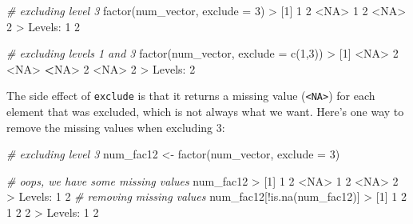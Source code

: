\documentclass[
]{book}
\newenvironment{Shaded}{\begin{snugshade}}{\end{snugshade}}
\newcommand{\AttributeTok}[1]{\textcolor[rgb]{0.77,0.63,0.00}{#1}}
\newcommand{\CommentTok}[1]{\textcolor[rgb]{0.56,0.35,0.01}{\textit{#1}}}
\newcommand{\ConstantTok}[1]{\textcolor[rgb]{0.00,0.00,0.00}{#1}}
\newcommand{\DecValTok}[1]{\textcolor[rgb]{0.00,0.00,0.81}{#1}}
\newcommand{\ErrorTok}[1]{\textcolor[rgb]{0.64,0.00,0.00}{\textbf{#1}}}
\newcommand{\FunctionTok}[1]{\textcolor[rgb]{0.00,0.00,0.00}{#1}}
\newcommand{\NormalTok}[1]{#1}
\newcommand{\OtherTok}[1]{\textcolor[rgb]{0.56,0.35,0.01}{#1}}
\newcommand{\SpecialCharTok}[1]{\textcolor[rgb]{0.00,0.00,0.00}{#1}}
\begin{document}
\begin{Shaded}
\begin{Highlighting}[]
\CommentTok{\# excluding level 3}
\FunctionTok{factor}\NormalTok{(num\_vector, }\AttributeTok{exclude =} \DecValTok{3}\NormalTok{)}
\SpecialCharTok{\textgreater{}}\NormalTok{ [}\DecValTok{1}\NormalTok{] }\DecValTok{1}    \DecValTok{2}    \SpecialCharTok{\textless{}}\ConstantTok{NA}\SpecialCharTok{\textgreater{}} \DecValTok{1}    \DecValTok{2}    \SpecialCharTok{\textless{}}\ConstantTok{NA}\SpecialCharTok{\textgreater{}} \DecValTok{2}   
\SpecialCharTok{\textgreater{}}\NormalTok{ Levels}\SpecialCharTok{:} \DecValTok{1} \DecValTok{2}

\CommentTok{\# excluding levels 1 and 3}
\FunctionTok{factor}\NormalTok{(num\_vector, }\AttributeTok{exclude =} \FunctionTok{c}\NormalTok{(}\DecValTok{1}\NormalTok{,}\DecValTok{3}\NormalTok{))}
\SpecialCharTok{\textgreater{}}\NormalTok{ [}\DecValTok{1}\NormalTok{] }\SpecialCharTok{\textless{}}\ConstantTok{NA}\SpecialCharTok{\textgreater{}} \DecValTok{2}    \SpecialCharTok{\textless{}}\ConstantTok{NA}\SpecialCharTok{\textgreater{}} \ErrorTok{\textless{}}\ConstantTok{NA}\SpecialCharTok{\textgreater{}} \DecValTok{2}    \SpecialCharTok{\textless{}}\ConstantTok{NA}\SpecialCharTok{\textgreater{}} \DecValTok{2}   
\SpecialCharTok{\textgreater{}}\NormalTok{ Levels}\SpecialCharTok{:} \DecValTok{2}
\end{Highlighting}
\end{Shaded}

The side effect of \texttt{exclude} is that it returns a missing value (\texttt{\textless{}NA\textgreater{}}) for
each element that was excluded, which is not always what we want. Here's one
way to remove the missing values when excluding 3:

\begin{Shaded}
\begin{Highlighting}[]
\CommentTok{\# excluding level 3}
\NormalTok{num\_fac12 }\OtherTok{\textless{}{-}} \FunctionTok{factor}\NormalTok{(num\_vector, }\AttributeTok{exclude =} \DecValTok{3}\NormalTok{)}

\CommentTok{\# oops, we have some missing values}
\NormalTok{num\_fac12}
\SpecialCharTok{\textgreater{}}\NormalTok{ [}\DecValTok{1}\NormalTok{] }\DecValTok{1}    \DecValTok{2}    \SpecialCharTok{\textless{}}\ConstantTok{NA}\SpecialCharTok{\textgreater{}} \DecValTok{1}    \DecValTok{2}    \SpecialCharTok{\textless{}}\ConstantTok{NA}\SpecialCharTok{\textgreater{}} \DecValTok{2}   
\SpecialCharTok{\textgreater{}}\NormalTok{ Levels}\SpecialCharTok{:} \DecValTok{1} \DecValTok{2}
\CommentTok{\# removing missing values}
\NormalTok{num\_fac12[}\SpecialCharTok{!}\FunctionTok{is.na}\NormalTok{(num\_fac12)]}
\SpecialCharTok{\textgreater{}}\NormalTok{ [}\DecValTok{1}\NormalTok{] }\DecValTok{1} \DecValTok{2} \DecValTok{1} \DecValTok{2} \DecValTok{2}
\SpecialCharTok{\textgreater{}}\NormalTok{ Levels}\SpecialCharTok{:} \DecValTok{1} \DecValTok{2}
\end{Highlighting}
\end{Shaded}
\end{document}
